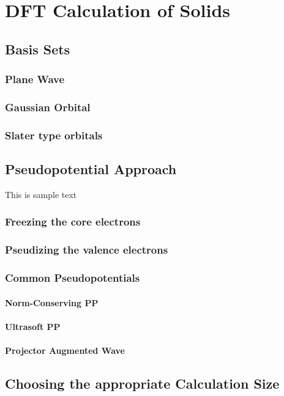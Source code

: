 \chapter{DFT Calculation of Solids}
\section{Basis Sets}
    \subsection{Plane Wave}
    \subsection{Gaussian Orbital}
    \subsection{Slater type orbitals}
\section{Pseudopotential Approach}
    This is sample text
    \subsection{Freezing the core electrons}
    \subsection{Pseudizing the valence electrons}
    \subsection{Common Pseudopotentials}
        \subsubsection{Norm-Conserving PP}
        \subsubsection{Ultrasoft PP}
        \subsubsection{Projector Augmented Wave}
\section{Choosing the appropriate Calculation Size}
